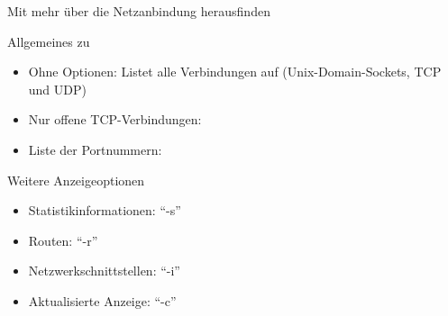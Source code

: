 \documentclass[aspectratio=43]{beamer}
\begin{document}
\begin{frame}{Mit  mehr über die Netzanbindung herausfinden}
  \begin{block}{Allgemeines zu }
    \begin{itemize}
      \item Ohne Optionen: Listet alle Verbindungen auf (Unix-Domain-Sockets, TCP und UDP)
      \item Nur offene TCP-Verbindungen: 
      \item Liste der Portnummern: 
    \end{itemize}
  \end{block}
  \begin{block}{Weitere Anzeigeoptionen}
    \begin{itemize}
      \item Statistikinformationen: ``-s''
      \item Routen: ``-r''
      \item Netzwerkschnittstellen: ``-i''
      \item Aktualisierte Anzeige: ``-c''
    \end{itemize}
  \end{block}
\end{frame}
\end{document}
